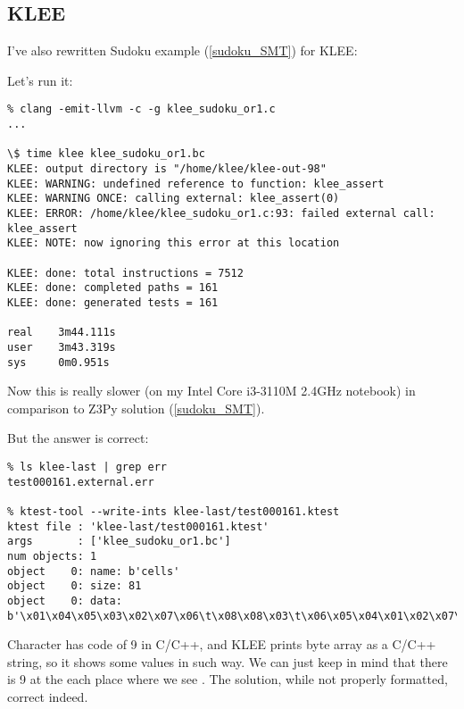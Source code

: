 \subsection{KLEE}

I've also rewritten Sudoku example (\ref{sudoku_SMT}) for KLEE:



Let's run it:

\begin{lstlisting}
% clang -emit-llvm -c -g klee_sudoku_or1.c
...

\$ time klee klee_sudoku_or1.bc
KLEE: output directory is "/home/klee/klee-out-98"
KLEE: WARNING: undefined reference to function: klee_assert
KLEE: WARNING ONCE: calling external: klee_assert(0)
KLEE: ERROR: /home/klee/klee_sudoku_or1.c:93: failed external call: klee_assert
KLEE: NOTE: now ignoring this error at this location

KLEE: done: total instructions = 7512
KLEE: done: completed paths = 161
KLEE: done: generated tests = 161

real    3m44.111s
user    3m43.319s
sys     0m0.951s
\end{lstlisting}

Now this is really slower (on my Intel Core i3-3110M 2.4GHz notebook) in comparison to Z3Py solution (\ref{sudoku_SMT}).

But the answer is correct:

\begin{lstlisting}
% ls klee-last | grep err
test000161.external.err

% ktest-tool --write-ints klee-last/test000161.ktest
ktest file : 'klee-last/test000161.ktest'
args       : ['klee_sudoku_or1.bc']
num objects: 1
object    0: name: b'cells'
object    0: size: 81
object    0: data: b'\x01\x04\x05\x03\x02\x07\x06\t\x08\x08\x03\t\x06\x05\x04\x01\x02\x07\x06\x07\x02\t\x01\x08\x05\x04\x03\x04\t\x06\x01\x08\x05\x03\x07\x02\x02\x01\x08\x04\x07\x03\t\x05\x06\x07\x05\x03\x02\t\x06\x04\x08\x01\x03\x06\x07\x05\x04\x02\x08\x01\t\t\x08\x04\x07\x06\x01\x02\x03\x05\x05\x02\x01\x08\x03\t\x07\x06\x04'
\end{lstlisting}

Character  has code of 9 in C/C++,
and KLEE prints byte array as a C/C++ string, so it shows some values in such way.
We can just keep in mind that there is 9 at the each place where we see .
The solution, while not properly formatted, correct indeed.

